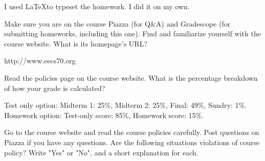 \documentclass[11pt]{article}
\begin{document}

\begin{Answer}
	I used \LaTeX to typeset the homework. I did it on my own.
\end{Answer}


\begin{Parts}
	
	\Part Make sure you are on the course Piazza (for Q\&A) and Gradescope (for submitting homeworks, including this one). Find and familiarize yourself with the course website. What is its homepage's URL?
	\begin{Answer}
		http://www.eecs70.org
	\end{Answer}
	
	\Part Read the policies page on the course website.  What is the percentage breakdown of how your grade is calculated?
	\begin{Answer}
		Test only option: Midterm 1: 25\%, Midterm 2: 25\%, Final: 49\%, 
		Sundry: 1\%. Homework option: Test-only score: 85\%, Homework score: 15\%.
	\end{Answer}
	
\end{Parts}




Go to the course website and read the course policies carefully. Post questions on Piazza if you have any questions. Are the following situations violations of course policy? Write "Yes" or "No", and a short explanation for each.
\end{document}

